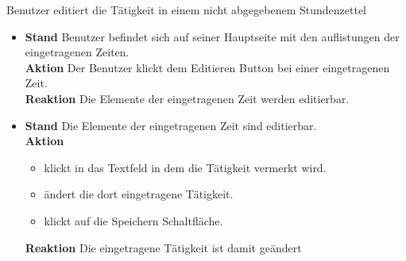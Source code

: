 \begin{requirements}
	 Benutzer editiert die Tätigkeit in einem nicht abgegebenem Stundenzettel
	\begin{itemize}
	    \item
	        \textbf{Stand} Benutzer befindet sich auf seiner Hauptseite mit den auflistungen der eingetragenen Zeiten. \\
	        \textbf{Aktion} Der Benutzer klickt dem Editieren Button bei einer eingetragenen Zeit.\\
            \textbf{Reaktion} Die Elemente der eingetragenen Zeit werden editierbar.
        \item
        \textbf{Stand} Die Elemente der eingetragenen Zeit sind editierbar.\\
        \textbf{Aktion}
            \begin{itemize} Der Benutzer
                \item klickt in das Textfeld in dem die Tätigkeit vermerkt wird.
                \item ändert die dort eingetragene Tätigkeit.
                \item klickt auf die Speichern Schaltfläche.
            \end{itemize}
            \textbf{Reaktion} Die eingetragene Tätigkeit ist damit geändert

    \end{itemize}
\end{requirements}
